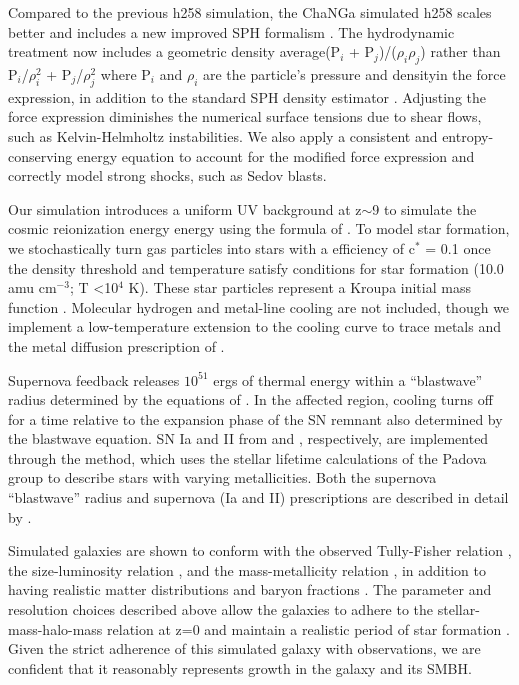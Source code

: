 \documentclass[]{emulateapj}
\begin{document}
Compared to the previous h258 simulation, the ChaNGa simulated h258 scales better and includes a new improved SPH formalism \citep{Keller2014}. The hydrodynamic treatment now includes a geometric density average\textemdash (P$_i$ + P$_j$)/($\rho_i \rho_j$) rather than P$_i$/$\rho_{i}^2$ + P$_j$/$\rho_{j}^2$ where P$_i$ and $\rho_i$ are the particle's pressure and density\textemdash in the force expression, in addition to the standard SPH density estimator \citep{Ritchie2001}. Adjusting the force expression diminishes the numerical surface tensions due to shear flows, such as Kelvin-Helmholtz instabilities. We also apply a consistent and entropy-conserving energy equation to account for the modified force expression and correctly model strong shocks, such as Sedov blasts.

Our simulation introduces a uniform UV background at z$\sim$9 to simulate the cosmic reionization energy energy using the formula of \cite{Haardt2012}. To model star formation, we stochastically turn gas particles into stars with a efficiency of c$^*$ = 0.1 once the density threshold and temperature satisfy conditions for star formation (10.0 amu cm$^{-3}$; T \textless 10$^4$ K). These star particles represent a Kroupa initial mass function \citep{Kroupa1993}. Molecular hydrogen and metal-line cooling are not included, though we implement a low-temperature extension to the cooling curve to trace metals \citep{Bromm2001} and the metal diffusion prescription of \cite{Shen2010}. 

Supernova feedback releases $10^{51}$ ergs of thermal energy within a ``blastwave'' radius determined by the equations of \cite{Ostriker1988}. In the affected region, cooling turns off for a time relative to the expansion phase of the SN remnant also determined by the blastwave equation. SN Ia and II from \cite{Thielemann1986} and \cite{Woosley1995}, respectively, are implemented through the \cite{Raiteri1996} method, which uses the stellar lifetime calculations of the Padova group \citep{Alongi1993, Bressan1993, Bertelli1994} to describe stars with varying metallicities. Both the supernova ``blastwave'' radius and supernova (Ia and II) prescriptions are described in detail by \cite{Stinson2006}. 

Simulated galaxies are shown to conform with the observed Tully-Fisher relation \citep{Governato2009}, the size-luminosity relation \citep{Brooks2011}, and the mass-metallicity relation \citep{Brooks2007,Christensen2015}, in addition to having realistic matter distributions and baryon fractions \citep{Governato2009a,Guedes2011}. The parameter and resolution choices described above allow the galaxies to adhere to the stellar-mass-halo-mass relation at z=0 and maintain a realistic period of star formation \citep{Moster2010,Munshi2013,Brooks2007,Maiolino2008}. Given the strict adherence of this simulated galaxy with observations, we are confident that it reasonably represents growth in the galaxy and its SMBH.
 
\end{document}
